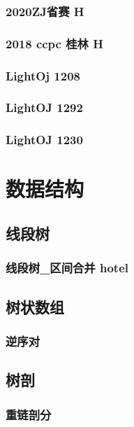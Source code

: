 \documentclass[10pt,a4paper]{article}
\begin{document}
\subsubsection{2020ZJ省赛 H}

\subsubsection{2018 ccpc 桂林 H}

\subsubsection{LightOj 1208}

\subsubsection{LightOJ 1292}

\subsubsection{LightOJ 1230}

\section{数据结构}
\subsection{线段树}
\subsubsection{线段树\_区间合并 hotel}

\subsection{树状数组}
\subsubsection{逆序对}

\subsection{树剖}
\subsubsection{重链剖分}

\end{document}
